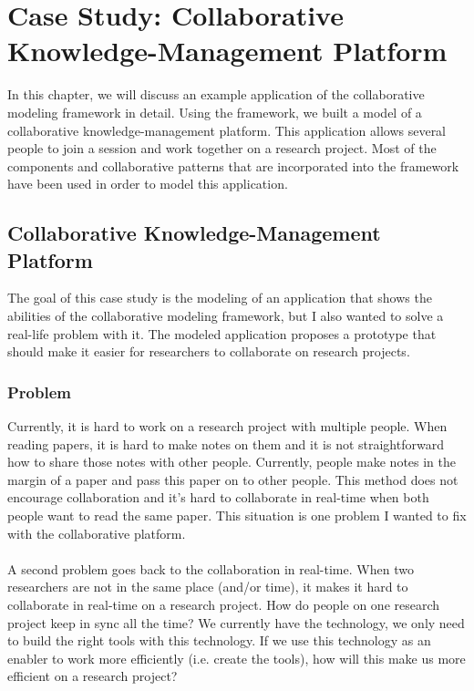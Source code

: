\chapter{Case Study: Collaborative Knowledge-Management Platform}

In this chapter, we will discuss an example application of the collaborative modeling framework in detail. Using the framework, we built a model of a collaborative knowledge-management platform. This application allows several people to join a session and work together on a research project. Most of the components and collaborative patterns that are incorporated into the framework have been used in order to model this application. 

\section{Collaborative Knowledge-Management Platform}

The goal of this case study is the modeling of an application that shows the abilities of the collaborative modeling framework, but I also wanted to solve a real-life problem with it. The modeled application proposes a prototype that should make it easier for researchers to collaborate on research projects.

\subsection{Problem}

Currently, it is hard to work on a research project with multiple people. When reading papers, it is hard to make notes on them and it is not straightforward how to share those notes with other people. Currently, people make notes in the margin of a paper and pass this paper on to other people. This method does not encourage collaboration and it's hard to collaborate in real-time when both people want to read the same paper. This situation is one problem I wanted to fix with the collaborative platform. \\ \\
A second problem goes back to the collaboration in real-time. When two researchers are not in the same place (and/or time), it makes it hard to collaborate in real-time on a research project. How do people on one research project keep in sync all the time? We currently have the technology, we only need to build the right tools with this technology. If we use this technology as an enabler to work more efficiently (i.e. create the tools), how will this make us more efficient on a research project?

